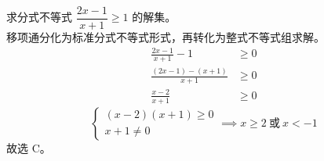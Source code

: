 \documentclass[12pt,a4paper]{exam-zh}
\begin{document}
\begin{solution}
    求分式不等式 $\dfrac{2x-1}{x+1} \ge 1$ 的解集。\\
    移项通分化为标准分式不等式形式，再转化为整式不等式组求解。
    \begin{align*}
        \frac{2x-1}{x+1} - 1 &\ge 0 \\
        \frac{(2x-1)-(x+1)}{x+1} &\ge 0 \\
        \frac{x-2}{x+1} &\ge 0
    \end{align*}
    \[
        \begin{cases} (x-2)(x+1) \ge 0 \\ x+1 \neq 0 \end{cases}
        \implies x \ge 2 \ \text{或} \ x < -1
    \]
    故选 C。
\end{solution}
\end{document}
